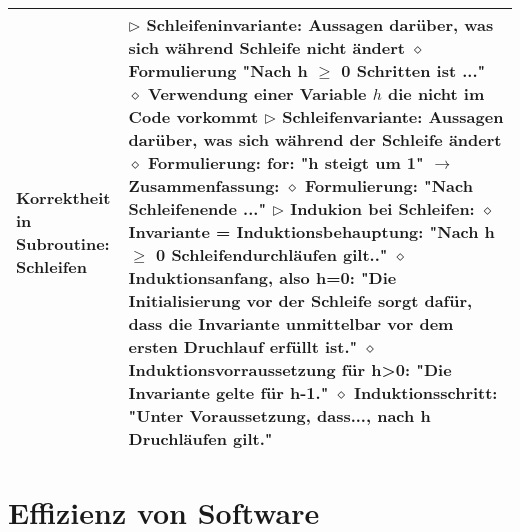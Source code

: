 \begin{table}[H]
\begin{tabular}{ | p{4cm} p{13.5cm} | }
	\makecell[l]{Korrektheit in \\ Subroutine: Schleifen} & 
	\makecell[l]
	{
	$\rhd$ Schleifeninvariante: Aussagen darüber, was sich während Schleife nicht ändert \\
	\hspace{0.4cm} $\diamond$ Formulierung "Nach h $\geq$ 0 Schritten ist ..." \\
	\hspace{0.4cm} $\diamond$ Verwendung einer Variable $h$ die nicht im Code vorkommt \\
	$\rhd$ Schleifenvariante: Aussagen darüber, was sich während der Schleife ändert \\
	\hspace{0.4cm} $\diamond$ Formulierung: for: "h steigt um 1" $\rightarrow$ Zusammenfassung: \\
	\hspace{0.4cm} $\diamond$ Formulierung: "Nach Schleifenende ..." \\
	$\rhd$ Indukion bei Schleifen: \\
	\hspace{0.4cm} $\diamond$ Invariante = Induktionsbehauptung: "Nach h $\geq$ 0 Schleifendurchläufen gilt.." \\
	\hspace{0.4cm} $\diamond$ Induktionsanfang, also h=0: "Die Initialisierung vor der Schleife sorgt dafür, \\
	\hspace{0.75cm} dass die Invariante unmittelbar vor dem ersten Druchlauf erfüllt ist." \\
	\hspace{0.4cm} $\diamond$ Induktionsvorraussetzung für h>0: "Die Invariante gelte für h-1." \\
	\hspace{0.4cm} $\diamond$ Induktionsschritt: "Unter Voraussetzung, dass..., nach h Druchläufen gilt." \\
	} 	\\ \hline


	\end{tabular}
	\end{table}



\section{Effizienz von Software}

